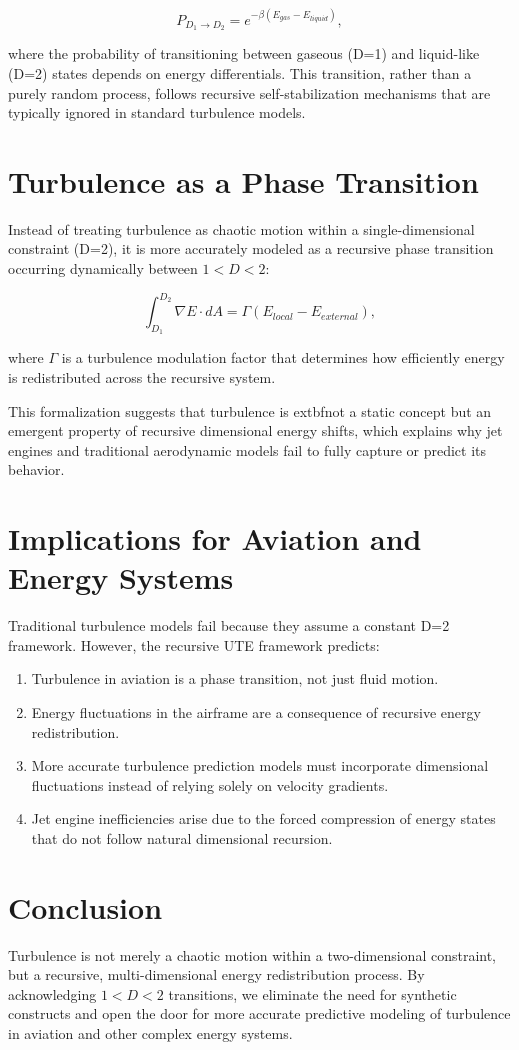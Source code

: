 \documentclass[letterpaper,12pt]{article}
\begin{document}
\begin{equation}
    P_{D_1 \to D_2} = e^{-\beta (E_{gas} - E_{liquid})},
\end{equation}

where the probability of transitioning between gaseous (D=1) and liquid-like (D=2) states depends on energy differentials. This transition, rather than a purely random process, follows recursive self-stabilization mechanisms that are typically ignored in standard turbulence models.

\section{Turbulence as a Phase Transition}
Instead of treating turbulence as chaotic motion within a single-dimensional constraint (D=2), it is more accurately modeled as a recursive phase transition occurring dynamically between $1 < D < 2$:

\begin{equation}
    \int_{D_1}^{D_2} \nabla E \cdot dA = \Gamma \left( E_{local} - E_{external} \right),
\end{equation}

where $\Gamma$ is a turbulence modulation factor that determines how efficiently energy is redistributed across the recursive system.

This formalization suggests that turbulence is 	extbf{not a static concept but an emergent property of recursive dimensional energy shifts}, which explains why jet engines and traditional aerodynamic models fail to fully capture or predict its behavior.

\section{Implications for Aviation and Energy Systems}
Traditional turbulence models fail because they assume a constant D=2 framework. However, the recursive UTE framework predicts:

\begin{enumerate}
    \item Turbulence in aviation is a phase transition, not just fluid motion.
    \item Energy fluctuations in the airframe are a consequence of recursive energy redistribution.
    \item More accurate turbulence prediction models must incorporate dimensional fluctuations instead of relying solely on velocity gradients.
    \item Jet engine inefficiencies arise due to the forced compression of energy states that do not follow natural dimensional recursion.
\end{enumerate}

\section{Conclusion}
Turbulence is not merely a chaotic motion within a two-dimensional constraint, but a recursive, multi-dimensional energy redistribution process. By acknowledging $1 < D < 2$ transitions, we eliminate the need for synthetic constructs and open the door for more accurate predictive modeling of turbulence in aviation and other complex energy systems.
\end{document}
